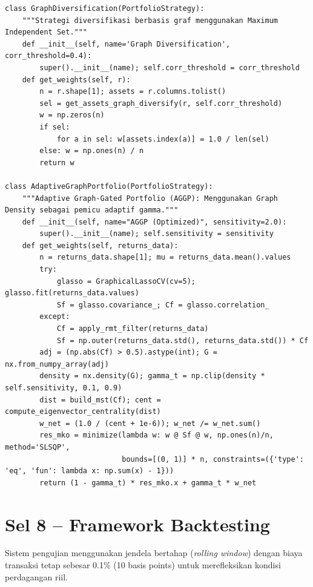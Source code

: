 \documentclass[12pt,a4paper]{article}
\begin{document}
\begin{lstlisting}[caption={Kelas-kelas strategi portofolio}]
class GraphDiversification(PortfolioStrategy):
    """Strategi diversifikasi berbasis graf menggunakan Maximum Independent Set."""
    def __init__(self, name='Graph Diversification', corr_threshold=0.4):
        super().__init__(name); self.corr_threshold = corr_threshold
    def get_weights(self, r):
        n = r.shape[1]; assets = r.columns.tolist()
        sel = get_assets_graph_diversify(r, self.corr_threshold)
        w = np.zeros(n)
        if sel:
            for a in sel: w[assets.index(a)] = 1.0 / len(sel)
        else: w = np.ones(n) / n
        return w

class AdaptiveGraphPortfolio(PortfolioStrategy):
    """Adaptive Graph-Gated Portfolio (AGGP): Menggunakan Graph Density sebagai pemicu adaptif gamma."""
    def __init__(self, name="AGGP (Optimized)", sensitivity=2.0):
        super().__init__(name); self.sensitivity = sensitivity
    def get_weights(self, returns_data):
        n = returns_data.shape[1]; mu = returns_data.mean().values
        try:
            glasso = GraphicalLassoCV(cv=5); glasso.fit(returns_data.values)
            Sf = glasso.covariance_; Cf = glasso.correlation_
        except:
            Cf = apply_rmt_filter(returns_data)
            Sf = np.outer(returns_data.std(), returns_data.std()) * Cf
        adj = (np.abs(Cf) > 0.5).astype(int); G = nx.from_numpy_array(adj)
        density = nx.density(G); gamma_t = np.clip(density * self.sensitivity, 0.1, 0.9)
        dist = build_mst(Cf); cent = compute_eigenvector_centrality(dist)
        w_net = (1.0 / (cent + 1e-6)); w_net /= w_net.sum()
        res_mko = minimize(lambda w: w @ Sf @ w, np.ones(n)/n, method='SLSQP', 
                           bounds=[(0, 1)] * n, constraints=({'type': 'eq', 'fun': lambda x: np.sum(x) - 1}))
        return (1 - gamma_t) * res_mko.x + gamma_t * w_net
\end{lstlisting}

\section{Sel 8 -- Framework Backtesting}
Sistem pengujian menggunakan jendela bertahap (\textit{rolling window}) dengan biaya transaksi tetap sebesar 0.1\% (10 basis points) untuk merefleksikan kondisi perdagangan riil.
\end{document}
